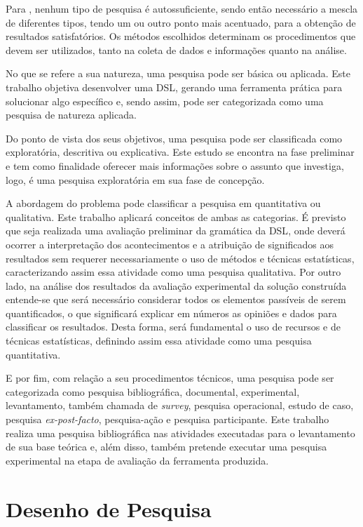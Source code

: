 Para , nenhum tipo de pesquisa é autossuficiente, sendo então necessário a mescla de diferentes tipos, tendo um ou outro ponto mais acentuado, para a obtenção de resultados satisfatórios. 
Os métodos escolhidos determinam os procedimentos que devem ser utilizados, tanto na coleta de dados e informações quanto na análise. 

No que se refere a sua natureza, uma pesquisa pode ser básica ou aplicada. 
Este trabalho objetiva desenvolver uma \ac{DSL}, gerando uma ferramenta prática para solucionar algo específico e, sendo assim, pode ser categorizada como uma pesquisa de natureza aplicada.

Do ponto de vista dos seus objetivos, uma pesquisa pode ser classificada como exploratória, descritiva ou explicativa. 
Este estudo se encontra na fase preliminar e tem como finalidade oferecer mais informações sobre o assunto que investiga, logo, é uma pesquisa exploratória em sua fase de concepção. 

A abordagem do problema pode classificar a pesquisa em quantitativa ou qualitativa. 
Este trabalho aplicará conceitos de ambas as categorias.
É previsto que seja realizada uma avaliação preliminar da gramática da \ac{DSL}, onde deverá ocorrer a interpretação dos acontecimentos e a atribuição de significados aos resultados sem requerer necessariamente o uso de métodos e técnicas estatísticas, caracterizando assim essa atividade como uma pesquisa qualitativa. 
Por outro lado, na análise dos resultados da avaliação experimental da solução construída entende-se que será necessário considerar todos os elementos passíveis de serem quantificados, o que significará explicar em números as opiniões e dados para classificar os resultados. Desta forma, será fundamental o uso de recursos e de técnicas estatísticas, definindo assim essa atividade como uma pesquisa quantitativa.

E por fim, com relação a seu procedimentos técnicos, uma pesquisa pode ser categorizada como pesquisa bibliográfica, documental, experimental, levantamento, também chamada de \textit{survey}, pesquisa operacional, estudo de caso, pesquisa \textit{ex-post-facto}, pesquisa-ação e pesquisa participante. 
Este trabalho realiza uma pesquisa bibliográfica nas atividades executadas para o levantamento de sua base teórica e, além disso, também pretende executar uma pesquisa experimental na etapa de avaliação da ferramenta produzida.

\section{Desenho de Pesquisa} \label{sec:DesenhoPesquisa}

